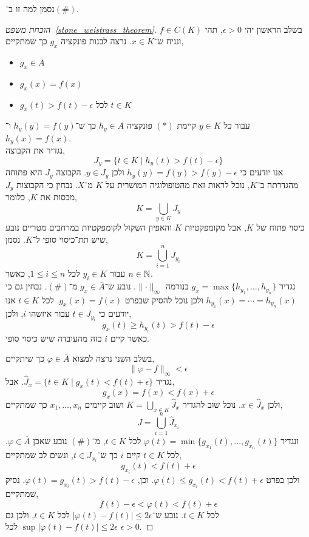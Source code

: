 נסמן למה זו ב־$(\#)$.
\begin{proof}[הוכחת משפט\ \ref{stone_weistrass_theorem}]
	בשלב הראשון יהי $\epsilon > 0$, תהי $f \in C(K)$ ונניח ש־$x \in K$.
	נרצה לבנות פונקציה $g_x$ כך שמתקיים,
	\begin{itemize}
		\item $g_x \in \overline{A}$
		\item $g_x(x) = f(x)$
		\item $g_x(t) > f(t) - \epsilon$ לכל $t \in K$
	\end{itemize}
	עבור כל $y \in K$ קיימת $(*)$ פונקציה $h_y \in A$ כך ש־$h_y(y) = f(y)$ ו־$h_y(x) = f(x)$. \\
	נגדיר את הקבוצה,
	\[
		J_y
		= \{ t \in K \mid h_y(t) > f(t) - \epsilon \}
	\]
	אנו יודעים כי $h_y(y) = f(y) > f(y) - \epsilon$ ולכן $y \in J_y$.
	הקבוצה $J_y$ היא פתוחה מהגדרתה ב־$K$, נוכל לראות זאת מהטופולוגיה המושרית על $K$ מ־$X$.
	נבחין כי הקבוצות $J_y$ מכסות את $K$, כלומר,
	\[
		K
		= \bigcup_{y \in K} J_y
	\]
	כיסוי פתוח של $K$, אבל מקומפקטיות $K$ והאפיון השקול לקומפקטיות במרחבים מטריים נובע שיש תת־כיסוי סופי ל־$K$.
	נסמן,
	\[
		K = \bigcup_{i = 1}^n J_{y_i}
	\]
	עבור $y_i \in K$ לכל $1 \le i \le n$, כאשר $n \in \mathbb{N}$. \\
	נגדיר $g_x = \max\{ h_{y_1}, \ldots, h_{y_n} \}$ בנורמה $\lVert \cdot \rVert_\infty$.
	נובע ש־$g_x \in \overline{A}$ מ־$(\#)$.
	נבחין גם כי $h_{y_1}(x) = \cdots = h_{y_n}(x)$ ולכן נוכל להסיק שבפרט $g_x(x) = f(x)$.
	לכל $t \in K$ אנו יודעים כי $t \in J_{y_i}$ עבור איזשהו $i$, ולכן,
	\[
		g_x(t)
		\ge h_{y_i}(t)
		> f(t) - \epsilon
	\]
	כאשר קיים $i$ כזה מהעובדה שיש כיסוי סופי.

	בשלב השני נרצה למצוא $\varphi \in \overline{A}$ כך שיתקיים,
	\[
		\lVert \varphi - f \rVert_\infty < \epsilon
	\]
	נגדיר $\hat{J}_x = \{ t \in K \mid g_x(t) < f(t) + \epsilon \}$.
	אבל,
	\[
		g_x(x)
		= f(x)
		< f(x) + \epsilon
	\]
	ולכן $x \in \hat{J}_x$.
	נוכל שוב להגדיר $K = \bigcup_{x \in K} \hat{J}_x$ ושוב קיימים $x_1, \ldots, x_n$ כך שמתקיים,
	\[
		J
		= \bigcup_{i = 1}^n \hat{J}_{x_i}
	\]
	ונגדיר $\varphi(t) = \min\{ g_{x_1}(t), \ldots, g_{x_n}(t) \}$ לכל $t \in K$, מ־$(\#)$ נובע שאכן $\varphi \in \overline{A}$.
	לכל $t \in K$ קיים $i$ כך ש־$t \in \hat{J}_{x_i}$, ונשים לב שמתקיים,
	\[
		g_{x_i}(t)
		< f(t) + \epsilon
	\]
	ולכן בפרט $\varphi(t) \le g_{x_i}(t) < f(t) + \epsilon$.
	וכן, $\varphi(t) = g_{x_i}(t) > f(t) - \epsilon$.
	נסיק שמתקיים,
	\[
		f(t) - \epsilon
		< \varphi(t)
		< f(t) + \epsilon
	\]
	לכל $t \in K$.
	נובע ש־$|\varphi(t) - f(t)| \le 2 \epsilon$ לכל $t \in K$, ולכן גם $\sup |\varphi(t) - f(t)| \le 2 \epsilon$ לכל $\epsilon > 0$.
\end{proof}

